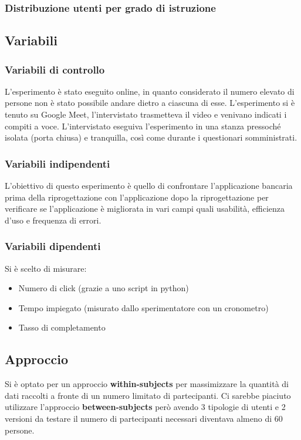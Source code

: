 \subsubsection{Distribuzione utenti per grado di istruzione}
\begin{center}
\end{center}

\subsection{Variabili}
\subsubsection{Variabili di controllo}
L'esperimento è stato eseguito online, in quanto considerato il numero elevato di persone non è stato possibile andare dietro a ciascuna di esse. L'esperimento si è tenuto su Google Meet, l'intervistato trasmetteva il video e venivano indicati i compiti a voce. L'intervistato eseguiva l'esperimento in una stanza pressoché isolata (porta chiusa) e tranquilla, così come durante i questionari somministrati.

\subsubsection{Variabili indipendenti}
L'obiettivo di questo esperimento è quello di confrontare l'applicazione bancaria prima della riprogettazione con l'applicazione dopo la riprogettazione per verificare se l'applicazione è migliorata in vari campi quali usabilità, efficienza d'uso e frequenza di errori.
\subsubsection{Variabili dipendenti}
Si è scelto di misurare:
\begin{itemize}
	\item Numero di click (grazie a uno script in python)
	\item Tempo impiegato (misurato dallo sperimentatore con un cronometro)
	\item Tasso di completamento 
\end{itemize}

\subsection{Approccio}
Si è optato per un approccio \textbf{within-subjects} per massimizzare la quantità di dati raccolti a fronte di un numero limitato di partecipanti. Ci sarebbe piaciuto utilizzare l'approccio \textbf{between-subjects} però avendo 3 tipologie di utenti e 2 versioni da testare il numero di partecipanti necessari diventava almeno di 60 persone.

